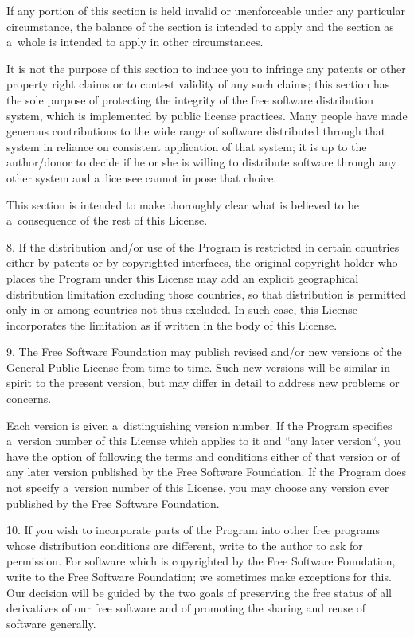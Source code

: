 \documentclass[a4paper, 11pt, twoside]{article}
\begin{document}
If any portion of this section is held invalid or unenforceable under any particular circumstance, the balance of the section is intended to apply and the section as a~whole is intended to apply in other circumstances.

It is not the purpose of this section to induce you to infringe any patents or other property right claims or to contest validity of any such claims; this section has the sole purpose of protecting the integrity of the free software distribution system, which is implemented by public license practices. Many people have made generous contributions to the wide range of software distributed through that system in reliance on consistent application of that system; it is up to the author/donor to decide if he or she is willing to distribute software through any other system and a~licensee cannot impose that choice.

This section is intended to make thoroughly clear what is believed to be a~consequence of the rest of this License.

8. If the distribution and/or use of the Program is restricted in certain countries either by patents or by copyrighted interfaces, the original copyright holder who places the Program under this License may add an explicit geographical distribution limitation excluding those countries, so that distribution is permitted only in or among countries not thus excluded. In such case, this License incorporates the limitation as if written in the body of this License.

9. The Free Software Foundation may publish revised and/or new versions of the General Public License from time to time. Such new versions will be similar in spirit to the present version, but may differ in detail to address new problems or concerns.

Each version is given a~distinguishing version number. If the Program specifies a~version number of this License which applies to it and “any later version“, you have the option of following the terms and conditions either of that version or of any later version published by the Free Software Foundation. If the Program does not specify a~version number of this License, you may choose any version ever published by the Free Software Foundation.

10. If you wish to incorporate parts of the Program into other free programs whose distribution conditions are different, write to the author to ask for permission. For software which is copyrighted by the Free Software Foundation, write to the Free Software Foundation; we sometimes make exceptions for this. Our decision will be guided by the two goals of preserving the free status of all derivatives of our free software and of promoting the sharing and reuse of software generally.
\end{document}
